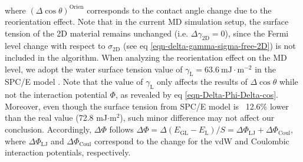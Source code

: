 \documentclass[journal=langd5,manuscript=article,email=true,hyperref=true,keywords=true]{achemso}
\begin{document}
where \((\Delta\cos \theta)^{\mathrm{Orien}}\) corresponds to the
contact angle change due to the reorientation effect. Note that in the
current MD simulation setup, the surface tension of the 2D material
remains unchanged (i.e.  \(\Delta \gamma_{\mathrm{2D}}=0\)), since the
Fermi level change with respect to \(\sigma_{\mathrm{2D}}\) (see eq
\ref{eqn-delta-gamma-sigma-free-2D}) is not included in the algorithm.
When analyzing the reorientation effect on the MD level, we adopt the
water surface tension value of
\(\gamma_{\mathrm{L}}=63.6\ \mathrm{mJ}\cdot \mathrm{m}^{-2}\) in the
SPC/E model \cite{Vega_2007}. Note that the value of
\(\gamma_{\mathrm{L}}\) only affects the results of
\(\Delta \cos \theta\) while not the interaction potential \(\Phi\), as revealed by eq
\ref{eqn-Delta-Phi-Delta-cos}. Moreover, even though the surface
tension from SPC/E model is ~12.6\% lower than the real value (72.8
mJ\(\cdot\)m\(^2\)), such minor difference may not affect our
conclusion. Accordingly, \(\Delta \Phi\) follows
\(\Delta \Phi = \Delta (E_{\mathrm{GL}} - E_{\mathrm{L}})/S = \Delta
\Phi_{\mathrm{LJ}} + \Delta \Phi_{\mathrm{Coul}}\), where
\(\Delta \Phi_{\mathrm{LJ}}\) and \(\Delta \Phi_{\mathrm{Coul}}\)
correspond to the change for the vdW and Coulombic interaction
potentials, respectively.
\end{document}
